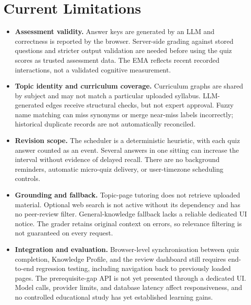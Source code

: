 \documentclass[11pt, a4paper, oneside]{report}
\begin{document}
\section{Current Limitations}
\begin{itemize}[leftmargin=2em, itemsep=6pt]
  \item \textbf{Assessment validity.} Answer keys are generated by an LLM and correctness is reported by the browser. Server-side grading against stored questions and stricter output validation are needed before using the quiz scores as trusted assessment data. The EMA reflects recent recorded interactions, not a validated cognitive measurement.
  \item \textbf{Topic identity and curriculum coverage.} Curriculum graphs are shared by subject and may not match a particular uploaded syllabus. LLM-generated edges receive structural checks, but not expert approval. Fuzzy name matching can miss synonyms or merge near-miss labels incorrectly; historical duplicate records are not automatically reconciled.
  \item \textbf{Revision scope.} The scheduler is a deterministic heuristic, with each quiz answer counted as an event. Several answers in one sitting can increase the interval without evidence of delayed recall. There are no background reminders, automatic micro-quiz delivery, or user-timezone scheduling controls.
  \item \textbf{Grounding and fallback.} Topic-page tutoring does not retrieve uploaded material. Optional web search is not active without its dependency and has no peer-review filter. General-knowledge fallback lacks a reliable dedicated UI notice. The grader retains original context on errors, so relevance filtering is not guaranteed on every request.
  \item \textbf{Integration and evaluation.} Browser-level synchronisation between quiz completion, Knowledge Profile, and the review dashboard still requires end-to-end regression testing, including navigation back to previously loaded pages. The prerequisite-gap API is not yet presented through a dedicated UI. Model calls, provider limits, and database latency affect responsiveness, and no controlled educational study has yet established learning gains.
\end{itemize}
\end{document}
